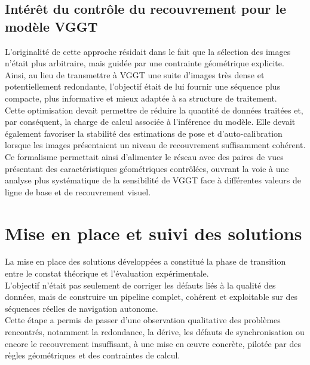 \documentclass[12pt,a4paper,oneside]{report}
\begin{document}
\subsection{Intérêt du contrôle du recouvrement pour le modèle VGGT}

\hspace*{.3cm}L'originalité de cette approche résidait dans le fait que la sélection des images n'était plus arbitraire, mais guidée par une contrainte géométrique explicite.\\
Ainsi, au lieu de transmettre à VGGT une suite d'images très dense et potentiellement redondante, l'objectif était de lui fournir une séquence plus compacte, plus informative et mieux adaptée à sa structure de traitement.\\

\hspace*{.3cm}Cette optimisation devait permettre de réduire la quantité de données traitées et, par conséquent, la charge de calcul associée à l'inférence du modèle. Elle devait également favoriser la stabilité des estimations de pose et d'auto-calibration lorsque les images présentaient un niveau de recouvrement suffisamment cohérent.\\
\hspace*{.3cm}Ce formalisme permettait ainsi d'alimenter le réseau avec des paires de vues présentant des caractéristiques géométriques contrôlées, ouvrant la voie à une analyse plus systématique de la sensibilité de VGGT face à différentes valeurs de ligne de base et de recouvrement visuel.

\newpage


\section{Mise en place et suivi des solutions}

\hspace*{0.3cm}La mise en place des solutions développées a constitué la phase de transition entre le constat théorique et l'évaluation expérimentale.\\

\hspace*{.3cm}L'objectif n'était pas seulement de corriger les défauts liés à la qualité des données, mais de construire un pipeline complet, cohérent et exploitable sur des séquences réelles de navigation autonome.\\
\hspace*{.3cm}Cette étape a permis de passer d'une observation qualitative des problèmes rencontrés, notamment la redondance, la dérive, les défauts de synchronisation ou encore le recouvrement insuffisant, à une mise en œuvre concrète, pilotée par des règles géométriques et des contraintes de calcul.
\end{document}
